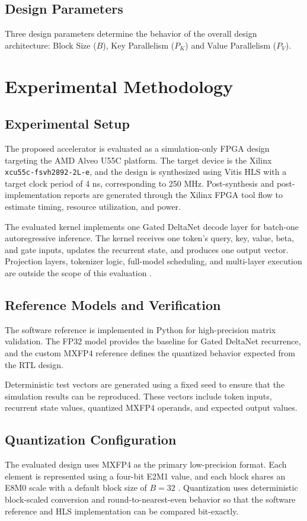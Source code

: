 \documentclass[conference]{IEEEtran}
\begin{document}
\subsection{Design Parameters}
Three design parameters determine the behavior of the overall design architecture: Block Size ($B$), Key Parallelism ($P_K$) and Value Parallelism ($P_V$).

\section{Experimental Methodology}

\subsection{Experimental Setup}
The proposed accelerator is evaluated as a simulation-only FPGA design targeting the AMD Alveo U55C platform. The target device is the Xilinx \texttt{xcu55c-fsvh2892-2L-e}, and the design is synthesized using Vitis HLS with a target clock period of 4 ns, corresponding to 250 MHz. Post-synthesis and post-implementation reports are generated through the Xilinx FPGA tool flow to estimate timing, resource utilization, and power.

The evaluated kernel implements one Gated DeltaNet decode layer for batch-one autoregressive inference. The kernel receives one token's query, key, value, beta, and gate inputs, updates the recurrent state, and produces one output vector. Projection layers, tokenizer logic, full-model scheduling, and multi-layer execution are outside the scope of this evaluation \cite{b3,b10}.

\subsection{Reference Models and Verification}
The software reference is implemented in Python for high-precision matrix validation. The FP32 model provides the baseline for Gated DeltaNet recurrence, and the custom MXFP4 reference defines the quantized behavior expected from the RTL design.

Deterministic test vectors are generated using a fixed seed to ensure that the simulation results can be reproduced. These vectors include token inputs, recurrent state values, quantized MXFP4 operands, and expected output values.

\subsection{Quantization Configuration}
The evaluated design uses MXFP4 as the primary low-precision format. Each element is represented using a four-bit E2M1 value, and each block shares an E8M0 scale with a default block size of $B=32$ \cite{b12}. Quantization uses deterministic block-scaled conversion and round-to-nearest-even behavior so that the software reference and HLS implementation can be compared bit-exactly.
\end{document}
